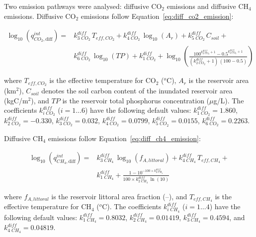\documentclass[review, authoryear, 1p]{elsarticle} %
\begin{document}
Two emission pathways were analysed: diffusive CO$_2$ emissions and diffusive CH$_4$ emissions.
Diffusive CO$_2$ emissions follow Equation~\ref{eq:diff_co2_emission}:

\begin{equation}
\label{eq:diff_co2_emission}
\begin{split}
\log_{10}\!\left(q_{CO_{2},\text{diff}}^{int}\right) ={}&
k_{3 \; CO_2}^{diff}\,T_{eff,CO_2}
+ k_{4 \; CO_2}^{diff} \, \log_{10} \left(A_r\right)
+ k_{5 \; CO_2}^{diff} \, C_{soil} +
\\[6pt]
&
k_{6 \; CO_2}^{diff} \, \log_{10} (TP) + k_{1 \; CO_2}^{diff} + \log_{10}\!\left(\frac{100^{k_{2 \; CO_2}^{diff} + 1} - 0.5^{k_{2 \; CO_2}^{diff} + 1}}{(k_{2 \; CO_2}^{diff} + 1) \, (100 - 0.5)}\right)
\end{split}
\end{equation}

where $T_{eff,CO_2}$ is the effective temperature for CO$_2$ ($^o$C), $A_r$ is the reservoir area (km$^2$), $C_{soil}$ denotes the soil carbon content of the inundated reservoir area (kgC/m$^2$), and $TP$ is the reservoir total phosphorus concentration ($\mu$g/L). The coefficients $k_{i \; CO_2}^{diff}$ ($i=1 \ldots 6$) have the following default values: $k_{1 \; CO_2}^{diff} = 1.860$, $k_{2 \; CO_2}^{diff} = -0.330$, $k_{3 \; CO_2}^{diff} = 0.032$, $k_{4 \; CO_2}^{diff} = 0.0799$, $k_{5 \; CO_2}^{diff} = 0.0155$, $k_{6 \; CO_2}^{diff} = 0.2263$.

Diffusive CH$_4$ emissions follow Equation~\ref{eq:diff_ch4_emission}:

\begin{equation}
\label{eq:diff_ch4_emission}
\begin{split}
\log_{10}\!\left(q_{CH_{4},\text{diff}}^{int}\right)={}&
k_{3 \; CH_4}^{diff}\,\log_{10}(f_{A,littoral})
+ k_{4 \; CH_4}^{diff}\,T_{eff,CH_4} +
\\[6pt]
&
k_{1 \; CH_4}^{diff} + \frac{1 - 10^{-100 \times k_{2 \; CH_4}^{diff}}}{100 \times k_{2 \; CH_4}^{diff} \, \ln(10)}
\end{split}
\end{equation}

where $f_{A,littoral}$ is the reservoir littoral area fraction (--), and $T_{eff,CH_4}$ is the effective temperature for CH$_4$ ($^o$C). 
The coefficients $k_{i \; CH_4}^{diff}$ ($i=1 \ldots 4$) have the following default values: $k_{1 \; CH_4}^{diff} = 0.8032$, $k_{2 \; CH_4}^{diff} = 0.01419$, $k_{3 \; CH_4}^{diff} = 0.4594$, and $k_{4 \; CH_4}^{diff} = 0.04819$.
\end{document}
